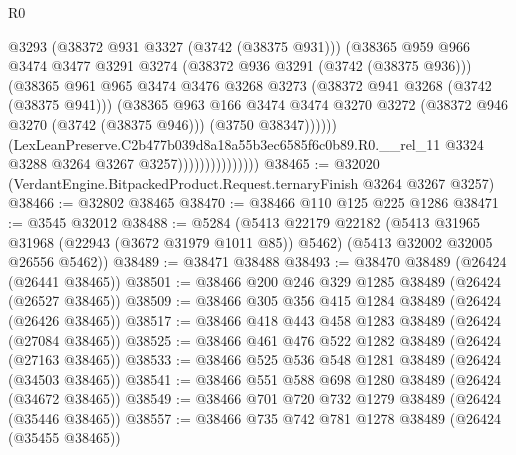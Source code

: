\begin{lexlean}{R0}
\begin{coremodule}
                                    @3293
                                    (@38372 @931 @3327 (@3742 (@38375 @931)))
                                    (@38365
                                      @959
                                      @966
                                      @3474
                                      @3477
                                      @3291
                                      @3274
                                      (@38372 @936 @3291 (@3742 (@38375 @936)))
                                      (@38365
                                        @961
                                        @965
                                        @3474
                                        @3476
                                        @3268
                                        @3273
                                        (@38372 @941 @3268 (@3742 (@38375 @941)))
                                        (@38365
                                          @963
                                          @166
                                          @3474
                                          @3474
                                          @3270
                                          @3272
                                          (@38372 @946 @3270 (@3742 (@38375 @946)))
                                          (@3750 @38347))))))
                                (LexLeanPreserve.C2b477b039d8a18a55b3ec6585f6c0b89.R0.__rel_11
                                  @3324
                                  @3288
                                  @3264
                                  @3267
                                  @3257)))))))))))))))
@38465 := @32020 (VerdantEngine.BitpackedProduct.Request.ternaryFinish @3264 @3267 @3257)
@38466 := @32802 @38465
@38470 := @38466 @110 @125 @225 @1286
@38471 := @3545 @32012
@38488 := @5284
    (@5413
      @22179
      @22182
      (@5413 @31965 @31968 (@22943 (@3672 @31979 @1011 @85)) @5462)
      (@5413 @32002 @32005 @26556 @5462))
@38489 := @38471 @38488
@38493 := @38470 @38489 (@26424 (@26441 @38465))
@38501 := @38466 @200 @246 @329 @1285 @38489 (@26424 (@26527 @38465))
@38509 := @38466 @305 @356 @415 @1284 @38489 (@26424 (@26426 @38465))
@38517 := @38466 @418 @443 @458 @1283 @38489 (@26424 (@27084 @38465))
@38525 := @38466 @461 @476 @522 @1282 @38489 (@26424 (@27163 @38465))
@38533 := @38466 @525 @536 @548 @1281 @38489 (@26424 (@34503 @38465))
@38541 := @38466 @551 @588 @698 @1280 @38489 (@26424 (@34672 @38465))
@38549 := @38466 @701 @720 @732 @1279 @38489 (@26424 (@35446 @38465))
@38557 := @38466 @735 @742 @781 @1278 @38489 (@26424 (@35455 @38465))

\end{coremodule}
\end{lexlean}
